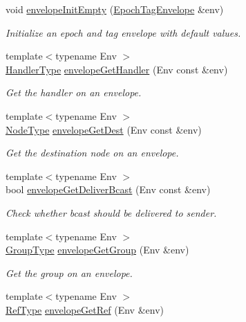\begin{DoxyCompactItemize}
void \hyperlink{namespacevt_a358f72f3e1d5ce12cca7d622ee512302}{envelope\+Init\+Empty} (\hyperlink{namespacevt_af23b58014ced6898422213a0e5e6a27a}{Epoch\+Tag\+Envelope} \&env)
\begin{DoxyCompactList}\small\item\em Initialize an epoch and tag envelope with default values. \end{DoxyCompactList}\item 
{\footnotesize template$<$typename Env $>$ }\\\hyperlink{namespacevt_af64846b57dfcaf104da3ef6967917573}{Handler\+Type} \hyperlink{namespacevt_ad3c1fff07670b717ba492d97e9eecc48}{envelope\+Get\+Handler} (Env const \&env)
\begin{DoxyCompactList}\small\item\em Get the handler on an envelope. \end{DoxyCompactList}\item 
{\footnotesize template$<$typename Env $>$ }\\\hyperlink{namespacevt_a866da9d0efc19c0a1ce79e9e492f47e2}{Node\+Type} \hyperlink{namespacevt_a99cdbbb47f13203e14b01fa43bca99e9}{envelope\+Get\+Dest} (Env const \&env)
\begin{DoxyCompactList}\small\item\em Get the destination node on an envelope. \end{DoxyCompactList}\item 
{\footnotesize template$<$typename Env $>$ }\\bool \hyperlink{namespacevt_a3f298caa64a97f60a0772b74cad8b620}{envelope\+Get\+Deliver\+Bcast} (Env const \&env)
\begin{DoxyCompactList}\small\item\em Check whether bcast should be delivered to sender. \end{DoxyCompactList}\item 
{\footnotesize template$<$typename Env $>$ }\\\hyperlink{namespacevt_a27b5e4411c9b6140c49100e050e2f743}{Group\+Type} \hyperlink{namespacevt_a76b9bdf05b27d6470bac66186c32d9eb}{envelope\+Get\+Group} (Env \&env)
\begin{DoxyCompactList}\small\item\em Get the group on an envelope. \end{DoxyCompactList}\item 
{\footnotesize template$<$typename Env $>$ }\\\hyperlink{namespacevt_a9b39ce9494bb04674d0d5b895a5aa50f}{Ref\+Type} \hyperlink{namespacevt_ad664e6e94c1ea309344adad1c3fb291c}{envelope\+Get\+Ref} (Env \&env)

\end{DoxyCompactItemize}
